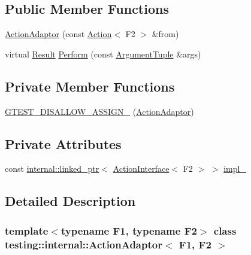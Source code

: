 \subsection*{Public Member Functions}
\begin{DoxyCompactItemize}
\item 
\hyperlink{classtesting_1_1internal_1_1ActionAdaptor_a24ba3330ef3cc365b956c50ec73e4177}{Action\+Adaptor} (const \hyperlink{classtesting_1_1Action}{Action}$<$ F2 $>$ \&from)
\item 
virtual \hyperlink{classtesting_1_1internal_1_1ActionAdaptor_afa8f7872b6db3d8f1545fd98b45b0b95}{Result} \hyperlink{classtesting_1_1internal_1_1ActionAdaptor_a8d8a47a31f068cf6e0c95b91605d5540}{Perform} (const \hyperlink{classtesting_1_1internal_1_1ActionAdaptor_a4f78fb73f97b72fea8a93b78a8ab5704}{Argument\+Tuple} \&args)
\end{DoxyCompactItemize}
\subsection*{Private Member Functions}
\begin{DoxyCompactItemize}
\item 
\hyperlink{classtesting_1_1internal_1_1ActionAdaptor_ad46465f82ccd055324fa267308c2753e}{G\+T\+E\+S\+T\+\_\+\+D\+I\+S\+A\+L\+L\+O\+W\+\_\+\+A\+S\+S\+I\+G\+N\+\_\+} (\hyperlink{classtesting_1_1internal_1_1ActionAdaptor}{Action\+Adaptor})
\end{DoxyCompactItemize}
\subsection*{Private Attributes}
\begin{DoxyCompactItemize}
\item 
const \hyperlink{classtesting_1_1internal_1_1linked__ptr}{internal\+::linked\+\_\+ptr}$<$ \hyperlink{classtesting_1_1ActionInterface}{Action\+Interface}$<$ F2 $>$ $>$ \hyperlink{classtesting_1_1internal_1_1ActionAdaptor_a555b8bc3e770b9a0d824be1ee2403783}{impl\+\_\+}
\end{DoxyCompactItemize}


\subsection{Detailed Description}
\subsubsection*{template$<$typename F1, typename F2$>$\newline
class testing\+::internal\+::\+Action\+Adaptor$<$ F1, F2 $>$}



